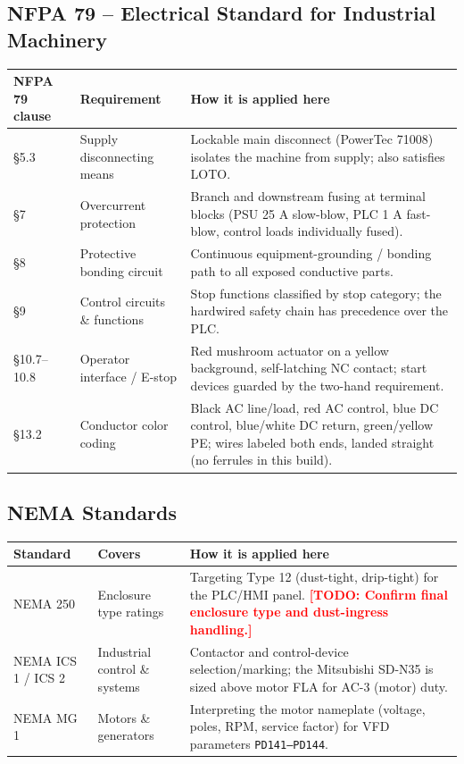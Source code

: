 \documentclass[hidelinks,12pt]{article}
\newcommand{\todo}[1]{\textcolor{red}{\textbf{[TODO: #1]}}}
\begin{document}
\subsection{NFPA 79 -- Electrical Standard for Industrial Machinery}
\label{subsec:nfpa79}
\renewcommand{\arraystretch}{1.3}
\noindent\begin{tabularx}{\textwidth}{|p{2.5cm}|p{3.0cm}|X|}
\hline
\rowcolor{PSUgreen!12}\textbf{NFPA 79 clause} & \textbf{Requirement} & \textbf{How it is applied here} \\
\hline
\S5.3 & Supply disconnecting means & Lockable main disconnect (PowerTec 71008) isolates the machine from supply; also satisfies LOTO. \\ \hline
\S7 & Overcurrent protection & Branch and downstream fusing at terminal blocks (PSU 25 A slow-blow, PLC 1 A fast-blow, control loads individually fused). \\ \hline
\S8 & Protective bonding circuit & Continuous equipment-grounding / bonding path to all exposed conductive parts. \\ \hline
\S9 & Control circuits \& functions & Stop functions classified by stop category; the hardwired safety chain has precedence over the PLC. \\ \hline
\S10.7--10.8 & Operator interface / E-stop & Red mushroom actuator on a yellow background, self-latching NC contact; start devices guarded by the two-hand requirement. \\ \hline
\S13.2 & Conductor color coding & Black AC line/load, red AC control, blue DC control, blue/white DC return, green/yellow PE; wires labeled both ends, landed straight (no ferrules in this build). \\
\hline
\end{tabularx}
\renewcommand{\arraystretch}{1.0}

\subsection{NEMA Standards}
\label{subsec:nema}
\renewcommand{\arraystretch}{1.3}
\noindent\begin{tabularx}{\textwidth}{|p{2.5cm}|p{3.0cm}|X|}
\hline
\rowcolor{PSUgreen!12}\textbf{Standard} & \textbf{Covers} & \textbf{How it is applied here} \\
\hline
NEMA 250 & Enclosure type ratings & Targeting Type 12 (dust-tight, drip-tight) for the PLC/HMI panel. \todo{Confirm final enclosure type and dust-ingress handling.} \\ \hline
NEMA ICS 1 / ICS 2 & Industrial control \& systems & Contactor and control-device selection/marking; the Mitsubishi SD-N35 is sized above motor FLA for AC-3 (motor) duty. \\ \hline
NEMA MG 1 & Motors \& generators & Interpreting the motor nameplate (voltage, poles, RPM, service factor) for VFD parameters \texttt{PD141--PD144}. \\
\hline
\end{tabularx}
\renewcommand{\arraystretch}{1.0}
\end{document}
